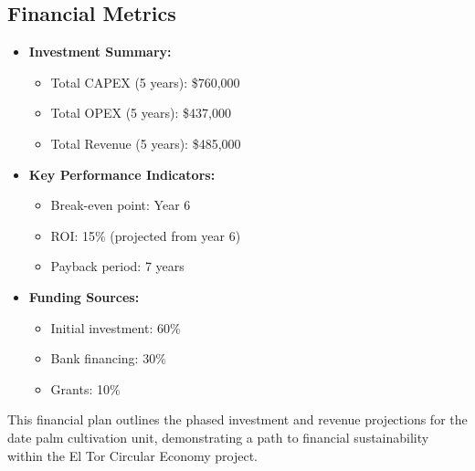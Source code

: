 \subsection{Financial Metrics}
\begin{itemize}
    \item \textbf{Investment Summary:}
    \begin{itemize}
        \item Total CAPEX (5 years): \$760,000
        \item Total OPEX (5 years): \$437,000
        \item Total Revenue (5 years): \$485,000
    \end{itemize}
    \item \textbf{Key Performance Indicators:}
    \begin{itemize}
        \item Break-even point: Year 6
        \item ROI: 15\% (projected from year 6)
        \item Payback period: 7 years
    \end{itemize}
    \item \textbf{Funding Sources:}
    \begin{itemize}
        \item Initial investment: 60\%
        \item Bank financing: 30\%
        \item Grants: 10\%
    \end{itemize}
\end{itemize}

This financial plan outlines the phased investment and revenue projections for the date palm cultivation unit, demonstrating a path to financial sustainability within the El Tor Circular Economy project.
